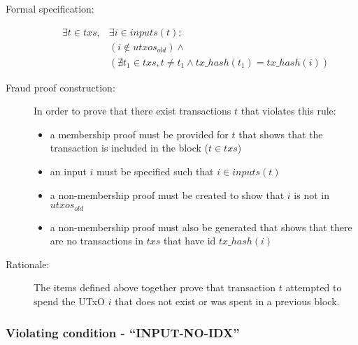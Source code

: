 \documentclass[../main.tex]{subfiles}
\begin{document}
\begin{description}

\item[Formal specification:]
\begin{equation*}
\begin{split}
    \exists t \in txs, &\exists i \in inputs(t): \\
    &( i \notin utxos_{old} ) \land  \\
    &( \nexists t_1 \in txs, t \neq t_1 \land tx\_hash(t_1) = tx\_hash(i) )
\end{split}
\end{equation*}

\item[Fraud proof construction:] In order to prove that there exist transactions $t$ that violates this rule:
\begin{itemize}
    \item a membership proof must be provided for $t$ that shows that the transaction is included in the block ($t \in txs$)
    \item an input $i$ must be specified such that $i \in inputs(t)$
    \item a non-membership proof must be created to show that $i$ is not in $utxos_{old}$
    \item a non-membership proof must also be generated that shows that there are no transactions in $txs$ that have id $tx\_hash(i)$
\end{itemize}

\item[Rationale:] The items defined above together prove that transaction $t$ attempted to spend the UTxO $i$ that does not exist or was spent in a previous block.

\end{description}

\subsubsection{Violating condition - ``INPUT-NO-IDX''}
\label{sec:INPUT-NO-IDX}
\end{document}
